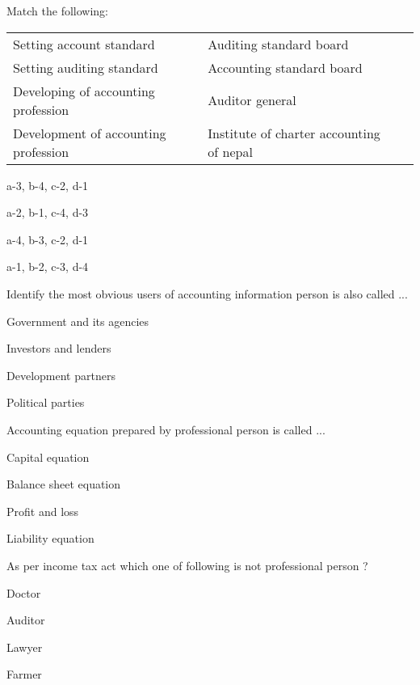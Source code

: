 \begin{questions}
\question Match the following:
  \begin{table}[h]
  \centering
  \begin{tabular}{lll}
    Setting account standard & Auditing standard board \\[2mm]
    Setting auditing standard & Accounting standard board \\
    Developing of accounting profession & Auditor general \\
    Development of accounting profession & Institute of charter accounting of nepal \\
  \end{tabular}
  \end{table}
  \begin{items}
  \item a-3, b-4, c-2, d-1
  \item a-2, b-1, c-4, d-3
  \item a-4, b-3, c-2, d-1
  \item a-1, b-2, c-3, d-4
  \end{items}

\question Identify the most obvious users of accounting information person is also called ...
  \begin{items}
  \item Government and its agencies
  \item Investors and lenders
  \item Development partners
  \item Political parties
  \end{items}

\question Accounting equation prepared by professional person is called ...
  \begin{items}
  \item Capital equation
  \item Balance sheet equation
  \item Profit and loss
  \item Liability equation
  \end{items}

\question As per income tax act which one of following is not professional person ?
  \begin{items}
  \item Doctor
  \item Auditor
  \item Lawyer
  \item Farmer
  \end{items}


\end{questions}

